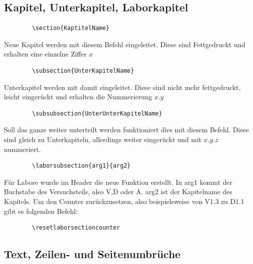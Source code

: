 \documentclass[
12pt,
a4paper,
headings=small,                    %
bibliography=totoc,                %
listof=totoc,                      %
parskip=half*,                     %
]{scrartcl}                        %
\newcommand{\laborsubsection}[2] {
	\renewcommand{\thesubsection}{#1 \thesection.\arabic{subsection}}
	\subsection{#2}
	\renewcommand{\thesubsection}{\thesection.\arabic{subsection}}
}
\newcommand{\resetlaborsectioncounter}{\setcounter{subsection}{0}}
\begin{document}
	\subsection{Kapitel, Unterkapitel, Laborkapitel}
	\begin{verbatim}
		\section{KaptitelName}
	\end{verbatim}
	Neue Kapitel werden mit diesem Befehl eingeleitet. Diese sind Fettgedruckt und erhalten eine einzelne Ziffer $x$\newline
	\begin{verbatim}
		\subsection{UnterKapitelName}
	\end{verbatim}
	Unterkapitel werden mit  damit eingeleitet. Diese sind nicht mehr fettgedruckt, leicht eingerückt und erhalten die Nummerierung $x.y$\newline
	\begin{verbatim}
		\subsubsection{UnterUnterKapitelName}
	\end{verbatim}
	Soll das ganze weiter unterteilt werden funktioniert dies mit diesem Befehl. Diese sind gleich zu Unterkapiteln, allerdings weiter eingerückt und mit $x.y.z$ nummeriert.\newline
	\begin{verbatim}
		\laborsubsection{arg1}{arg2}
	\end{verbatim} 
	Für Labore wurde im Header die neue Funktion erstellt. In arg1 kommt der Buchstabe des Versuchsteils, also V,D oder A. arg2 ist der Kapitelname des Kapitels.\newline
	Um den Counter zurückzusetzen, also beispielsweise von V1.3 zu D1.1 gibt es folgenden Befehl:
	\begin{verbatim}
		\resetlaborsectioncounter
	\end{verbatim} 
	\subsection{Text, Zeilen- und Seitenumbrüche}
	
\end{document}
